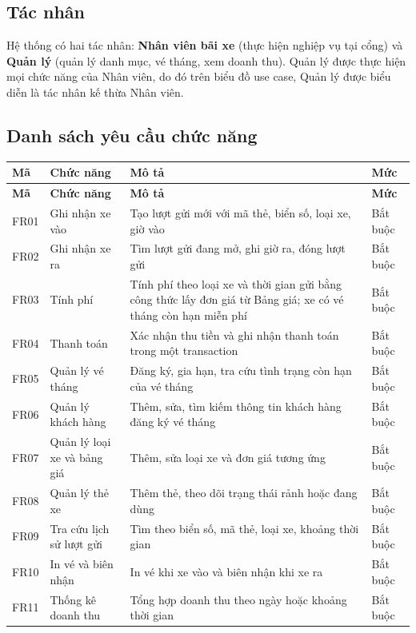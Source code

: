 \subsection{Tác nhân}

Hệ thống có hai tác nhân: \textbf{Nhân viên bãi xe} (thực hiện nghiệp vụ tại cổng) và \textbf{Quản lý} (quản lý danh mục, vé tháng, xem doanh thu). Quản lý được thực hiện mọi chức năng của Nhân viên, do đó trên biểu đồ use case, Quản lý được biểu diễn là tác nhân kế thừa Nhân viên.

\subsection{Danh sách yêu cầu chức năng}

\begin{longtable}{@{}l p{3.6cm} p{7.2cm} l@{}}
  \toprule
  \textbf{Mã} & \textbf{Chức năng} & \textbf{Mô tả} & \textbf{Mức} \\
  \midrule
  \endfirsthead
  \toprule
  \textbf{Mã} & \textbf{Chức năng} & \textbf{Mô tả} & \textbf{Mức} \\
  \midrule
  \endhead
  FR01 & Ghi nhận xe vào & Tạo lượt gửi mới với mã thẻ, biển số, loại xe, giờ vào & Bắt buộc \\
  FR02 & Ghi nhận xe ra & Tìm lượt gửi đang mở, ghi giờ ra, đóng lượt gửi & Bắt buộc \\
  FR03 & Tính phí & Tính phí theo loại xe và thời gian gửi bằng công thức lấy đơn giá từ Bảng giá; xe có vé tháng còn hạn miễn phí & Bắt buộc \\
  FR04 & Thanh toán & Xác nhận thu tiền và ghi nhận thanh toán trong một transaction & Bắt buộc \\
  FR05 & Quản lý vé tháng & Đăng ký, gia hạn, tra cứu tình trạng còn hạn của vé tháng & Bắt buộc \\
  FR06 & Quản lý khách hàng & Thêm, sửa, tìm kiếm thông tin khách hàng đăng ký vé tháng & Bắt buộc \\
  FR07 & Quản lý loại xe và bảng giá & Thêm, sửa loại xe và đơn giá tương ứng & Bắt buộc \\
  FR08 & Quản lý thẻ xe & Thêm thẻ, theo dõi trạng thái rảnh hoặc đang dùng & Bắt buộc \\
  FR09 & Tra cứu lịch sử lượt gửi & Tìm theo biển số, mã thẻ, loại xe, khoảng thời gian & Bắt buộc \\
  FR10 & In vé và biên nhận & In vé khi xe vào và biên nhận khi xe ra & Bắt buộc \\
  FR11 & Thống kê doanh thu & Tổng hợp doanh thu theo ngày hoặc khoảng thời gian & Bắt buộc \\

\end{longtable}
